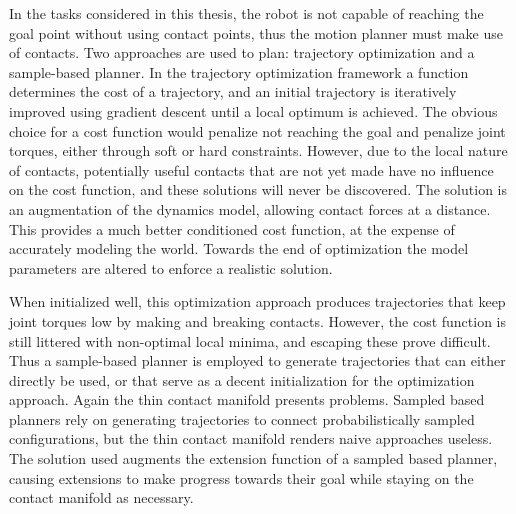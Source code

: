 \documentclass[../thesis.tex]{subfiles}
\begin{document}
In the tasks considered in this thesis, the robot is not capable of reaching the goal point without using contact points, thus the motion planner must make use of contacts.
Two approaches are used to plan: trajectory optimization and a sample-based planner.
In the trajectory optimization framework a function determines the cost of a trajectory, and an initial trajectory is iteratively improved using gradient descent until a local optimum is achieved.
The obvious choice for a cost function would penalize not reaching the goal and penalize joint torques, either through soft or hard constraints.
However, due to the local nature of contacts, potentially useful contacts that are not yet made have no influence on the cost function, and these solutions will never be discovered.
The solution is an augmentation of the dynamics model, allowing contact forces at a distance.
This provides a much better conditioned cost function, at the expense of accurately modeling the world.
Towards the end of optimization the model parameters are altered to enforce a realistic solution.

When initialized well, this optimization approach produces trajectories that keep joint torques low by making and breaking contacts.
However, the cost function is still littered with non-optimal local minima, and escaping these prove difficult.
Thus a sample-based planner is employed to generate trajectories that can either directly be used, or that serve as a decent initialization for the optimization approach.
Again the thin contact manifold presents problems.
Sampled based planners rely on generating trajectories to connect probabilistically sampled configurations, but the thin contact manifold renders naive approaches useless.
The solution used augments the extension function of a sampled based planner, causing extensions to make progress towards their goal while staying on the contact manifold as necessary.
\end{document}
